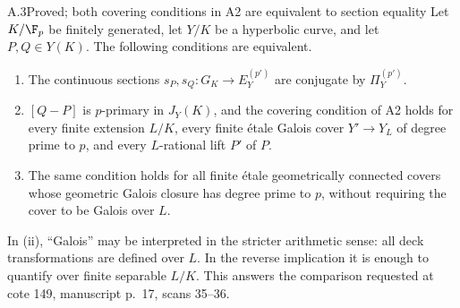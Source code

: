 \begin{claim}{A.3}{Proved; both covering conditions in A2 are equivalent to section equality}
Let $K/\F_p$ be finitely generated, let $Y/K$ be a hyperbolic curve,
and let $P,Q\in Y(K)$. The following conditions are equivalent.
\begin{enumerate}[label=(\roman*)]
\item The continuous sections $s_P,s_Q:G_K\to E_Y^{(p')}$ are
conjugate by $\Pi_Y^{(p')}$.
\item $[Q-P]$ is $p$-primary in $J_Y(K)$, and the covering condition
of A2 holds for every finite extension $L/K$, every finite \'etale
Galois cover $Y'\to Y_L$ of degree prime to $p$, and every
$L$-rational lift $P'$ of $P$.
\item The same condition holds for all finite \'etale geometrically
connected covers whose geometric Galois closure has degree prime
to $p$, without requiring the cover to be Galois over $L$.
\end{enumerate}
In (ii), ``Galois'' may be interpreted in the stricter arithmetic
sense: all deck transformations are defined over $L$. In the reverse
implication it is enough to quantify over finite separable $L/K$.
This answers the comparison requested at cote 149, manuscript
p.~17, scans 35--36.
\end{claim}
